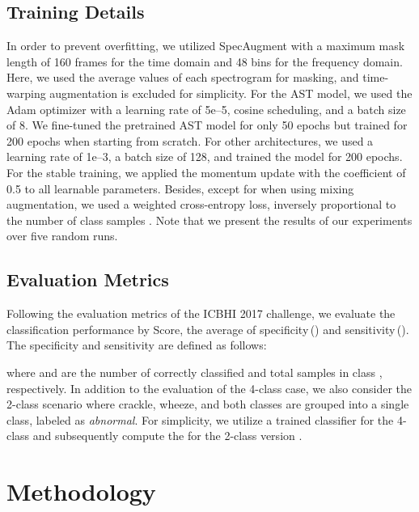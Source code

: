 \documentclass{INTERSPEECH2023}
\begin{document}
\subsection{Training Details}
\vspace{-2pt}



In order to prevent overfitting, we utilized SpecAugment \cite{park2019specaugment} with a maximum mask length of 160 frames for the time domain and 48 bins for the frequency domain. Here, we used the average values of each spectrogram for masking, and time-warping augmentation is excluded for simplicity.
For the AST model, we used the Adam optimizer with a learning rate of 5e--5, cosine scheduling, and a batch size of 8. We fine-tuned the pretrained AST model for only 50 epochs but trained for 200 epochs when starting from scratch.
For other architectures, we used a learning rate of 1e--3, a batch size of 128, and trained the model for 200 epochs. For the stable training, we applied the momentum update with the coefficient of 0.5 to all learnable parameters. Besides, except for when using mixing augmentation, we used a weighted cross-entropy loss, inversely proportional to the number of class samples \cite{gairola2021respirenet, moummad2022supervised}.
Note that we present the results of our experiments over five random runs.
\vspace{-5pt}


\subsection{Evaluation Metrics}
\vspace{-2pt}


Following the evaluation metrics of the ICBHI 2017 challenge, we evaluate the classification performance by Score, the average of specificity\,() and sensitivity\,().
The specificity and sensitivity are defined as follows: 
\vspace{-2pt}

where  and  are the number of correctly classified and total samples in class , respectively.
In addition to the evaluation of the 4-class case, we also consider the 2-class scenario where crackle, wheeze, and both classes are grouped into a single class, labeled as \textit{abnormal}. For simplicity, we utilize a trained classifier for the 4-class and subsequently compute the  for the 2-class version \cite{nguyen2022lung}.

 

\section{Methodology}
\end{document}
